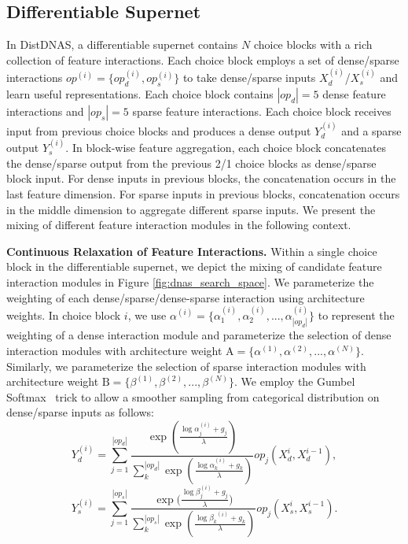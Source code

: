 \subsection{Differentiable Supernet}
In DistDNAS, a differentiable supernet contains $N$ choice blocks with a rich collection of feature interactions.
Each choice block employs a set of dense/sparse interactions $op^{(i)}=\{op_{d}^{(i)}, op_{s}^{(i)}\}$ to take dense/sparse inputs $X^{(i)}_{d}$/$X^{(i)}_{s}$ and learn useful representations. 
Each choice block contains $|op_{d}|=5$ dense feature interactions and $|op_{s}|=5$ sparse feature interactions. 
Each choice block receives input from previous choice blocks and produces a dense output $Y_d^{(i)}$ and a sparse output $Y_{s}^{(i)}$. 
In block-wise feature aggregation, each choice block concatenates the dense/sparse output from the previous 2/1 choice blocks as dense/sparse block input. 
For dense inputs in previous blocks, the concatenation occurs in the last feature dimension. 
For sparse inputs in previous blocks, concatenation occurs in the middle dimension to aggregate different sparse inputs.
We present the mixing of different feature interaction modules in the following context.


\noindent \textbf{Continuous Relaxation of Feature Interactions.}
Within a single choice block in the differentiable supernet, we depict the mixing of candidate feature interaction modules in Figure \ref{fig:dnas_search_space}.
We parameterize the weighting of each dense/sparse/dense-sparse interaction using architecture weights. 
In choice block $i$, we use $\alpha^{(i)}=\{\alpha_{1}^{(i)}, \alpha_{2}^{(i)}, ..., \alpha_{|op_{d}|}^{(i)}\}$ to represent the weighting of a dense interaction module and parameterize the selection of dense interaction modules with architecture weight $\mathrm{A}=\{\alpha^{(1)}, \alpha^{(2)}, ..., \alpha^{(N)}\}$.
Similarly, we parameterize the selection of sparse interaction modules with architecture weight $\mathrm{B}=\{ \beta^{(1)}, \beta^{(2)}, ..., \beta^{(N)} \}$. We employ the Gumbel Softmax~\cite{jang2016categorical} trick to allow a smoother sampling from categorical distribution on dense/sparse inputs as follows: 
\begin{equation}
Y_{d}^{(i)} = \sum_{j=1}^{|op_d|}\frac{\exp(\frac{\log \alpha_{j}^{(i)} + g_{j}}{\lambda})}{\sum_{k}^{|op_d|}\exp(\frac{\log \alpha_{k}^{(i)} + g_{k}}{\lambda})} op_{j}(X_{d}^{i},X_{d}^{i-1}),
    \label{eq:dense_block_out_dnas}
\end{equation}
\vspace{-0.5em}
\begin{equation}
    Y_{s}^{(i)} = \sum_{j=1}^{|op_s|} \frac{\exp{(\frac{\log \beta_{j}^{(i)} + g_{j}}{\lambda}})}{\sum_{k}^{|op_s|} \exp(\frac{\log {\beta_k}^{(i)} + g_{k}}{\lambda})} op_{j}(X_{s}^{i}, X_{s}^{i-1})
    \label{eq:sparse_block_out_dnas}.
\end{equation}

